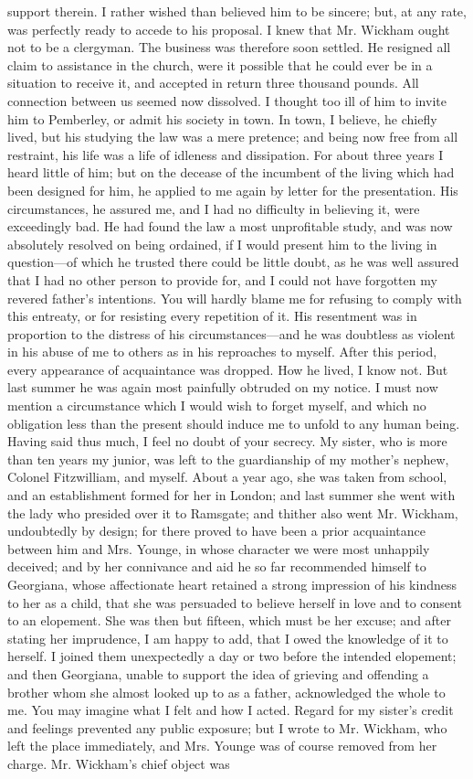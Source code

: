 \documentclass[12pt,openright]{book}
\begin{document}
support therein. I rather wished than believed him to be sincere; but, at any rate, was perfectly ready to accede to his proposal. I knew that Mr. Wickham ought not to be a clergyman. The business was therefore soon settled. He resigned all claim to assistance in the church, were it possible that he could ever be in a situation to receive it, and accepted in return three thousand pounds. All connection between us seemed now dissolved. I thought too ill of him to invite him to Pemberley, or admit his society in town. In town, I believe, he chiefly lived, but his studying the law was a mere pretence; and being now free from all restraint, his life was a life of idleness and dissipation. For about three years I heard little of him; but on the decease of the incumbent of the living which had been designed for him, he applied to me again by letter for the presentation. His circumstances, he assured me, and I had no difficulty in believing it, were exceedingly bad. He had found the law a most unprofitable study, and was now absolutely resolved on being ordained, if I would present him to the living in question—of which he trusted there could be little doubt, as he was well assured that I had no other person to provide for, and I could not have forgotten my revered father’s intentions. You will hardly blame me for refusing to comply with this entreaty, or for resisting every repetition of it. His resentment was in proportion to the distress of his circumstances—and he was doubtless as violent in his abuse of me to others as in his reproaches to myself. After this period, every appearance of acquaintance was dropped. How he lived, I know not. But last summer he was again most painfully obtruded on my notice. I must now mention a circumstance which I would wish to forget myself, and which no obligation less than the present should induce me to unfold to any human being. Having said thus much, I feel no doubt of your secrecy. My sister, who is more than ten years my junior, was left to the guardianship of my mother’s nephew, Colonel Fitzwilliam, and myself. About a year ago, she was taken from school, and an establishment formed for her in London; and last summer she went with the lady who presided over it to Ramsgate; and thither also went Mr. Wickham, undoubtedly by design; for there proved to have been a prior acquaintance between him and Mrs. Younge, in whose character we were most unhappily deceived; and by her connivance and aid he so far recommended himself to Georgiana, whose affectionate heart retained a strong impression of his kindness to her as a child, that she was persuaded to believe herself in love and to consent to an elopement. She was then but fifteen, which must be her excuse; and after stating her imprudence, I am happy to add, that I owed the knowledge of it to herself. I joined them unexpectedly a day or two before the intended elopement; and then Georgiana, unable to support the idea of grieving and offending a brother whom she almost looked up to as a father, acknowledged the whole to me. You may imagine what I felt and how I acted. Regard for my sister’s credit and feelings prevented any public exposure; but I wrote to Mr. Wickham, who left the place immediately, and Mrs. Younge was of course removed from her charge. Mr. Wickham’s chief object was 
\end{document}
